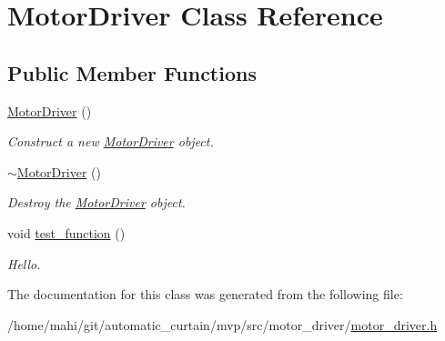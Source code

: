 \hypertarget{classMotorDriver}{}\section{Motor\+Driver Class Reference}
\label{classMotorDriver}
\subsection*{Public Member Functions}
\begin{DoxyCompactItemize}
\item 
\mbox{\label{classMotorDriver_a52801ff0d1d12eb8a74cbf09159a3001}} 
\hyperlink{classMotorDriver_a52801ff0d1d12eb8a74cbf09159a3001}{Motor\+Driver} ()
\begin{DoxyCompactList}\small\item\em Construct a new \hyperlink{classMotorDriver}{Motor\+Driver} object. \end{DoxyCompactList}\item 
\mbox{\label{classMotorDriver_a6ead9d8f796501adf9889a8e5aa7afc5}} 
\hyperlink{classMotorDriver_a6ead9d8f796501adf9889a8e5aa7afc5}{$\sim$\+Motor\+Driver} ()
\begin{DoxyCompactList}\small\item\em Destroy the \hyperlink{classMotorDriver}{Motor\+Driver} object. \end{DoxyCompactList}\item 
\mbox{\label{classMotorDriver_a25d214f75ebdfe4cd5aa464403d29612}} 
void \hyperlink{classMotorDriver_a25d214f75ebdfe4cd5aa464403d29612}{test\+\_\+function} ()
\begin{DoxyCompactList}\small\item\em Hello. \end{DoxyCompactList}\end{DoxyCompactItemize}


The documentation for this class was generated from the following file\+:\begin{DoxyCompactItemize}
\item 
/home/mahi/git/automatic\+\_\+curtain/mvp/src/motor\+\_\+driver/\hyperlink{motor__driver_8h}{motor\+\_\+driver.\+h}\end{DoxyCompactItemize}
